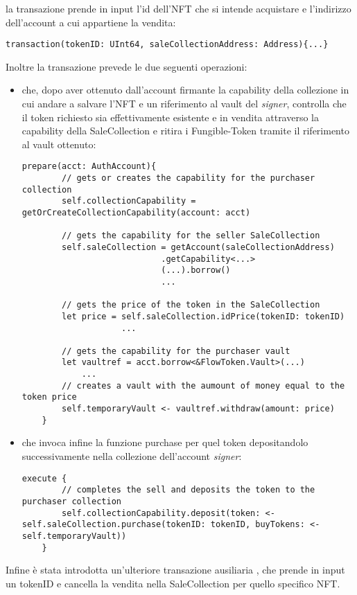 \subsubsection*{}la transazione prende in input l'id dell'NFT che si intende acquistare e l'indirizzo dell'account a cui appartiene la vendita:
\begin{lstlisting}[style=all, style=cadence]
transaction(tokenID: UInt64, saleCollectionAddress: Address){...}
\end{lstlisting}
Inoltre la transazione prevede le due seguenti operazioni:
\begin{itemize}
    \item {} che, dopo aver ottenuto dall'account firmante la capability della collezione in cui andare a salvare l'NFT e un riferimento al vault del \textit{signer}, controlla che il token richiesto sia effettivamente esistente e in vendita attraverso la capability della SaleCollection e ritira i Fungible-Token tramite il riferimento al vault ottenuto:
    \begin{lstlisting}[style=all, style=cadence]
prepare(acct: AuthAccount){
        // gets or creates the capability for the purchaser collection
        self.collectionCapability = getOrCreateCollectionCapability(account: acct)

        // gets the capability for the seller SaleCollection
        self.saleCollection = getAccount(saleCollectionAddress)
                            .getCapability<...>
                            (...).borrow()
                            ...

        // gets the price of the token in the SaleCollection
        let price = self.saleCollection.idPrice(tokenID: tokenID)
                    ...

        // gets the capability for the purchaser vault
        let vaultref = acct.borrow<&FlowToken.Vault>(...)
            ...
        // creates a vault with the aumount of money equal to the token price
        self.temporaryVault <- vaultref.withdraw(amount: price)
    }
\end{lstlisting}
    \item {} che invoca infine la funzione purchase per quel token depositandolo successivamente nella collezione dell'account \textit{signer}:
    \begin{lstlisting}[style=all, style=cadence]
execute {
        // completes the sell and deposits the token to the purchaser collection
        self.collectionCapability.deposit(token: <- self.saleCollection.purchase(tokenID: tokenID, buyTokens: <-self.temporaryVault))
    }
\end{lstlisting}
\end{itemize}

Infine è stata introdotta un'ulteriore transazione ausiliaria , che prende in input un tokenID e cancella la vendita nella SaleCollection per quello specifico NFT.